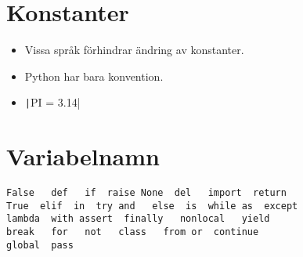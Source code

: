 \begin{frame}[fragile]
  \inputminted[highlightlines={14,20,27-28},linenos,firstline=11]{python}{examples/age.py}
\end{frame}


\section{Konstanter}

\begin{frame}
  \begin{remark}
    \begin{itemize}
      \item Vissa språk förhindrar ändring av konstanter.
      \item Python har bara konvention.
      \item \texttt|PI = 3.14|
    \end{itemize}
  \end{remark}
\end{frame}


\section{Variabelnamn}

\begin{frame}[fragile]
  \begin{remark}
    \begin{verbatim}
False   def   if  raise None  del   import  return
True  elif  in  try and   else  is  while as  except
lambda  with assert  finally   nonlocal   yield
break   for   not   class   from or  continue
global  pass
    \end{verbatim}
  \end{remark}
\end{frame}
